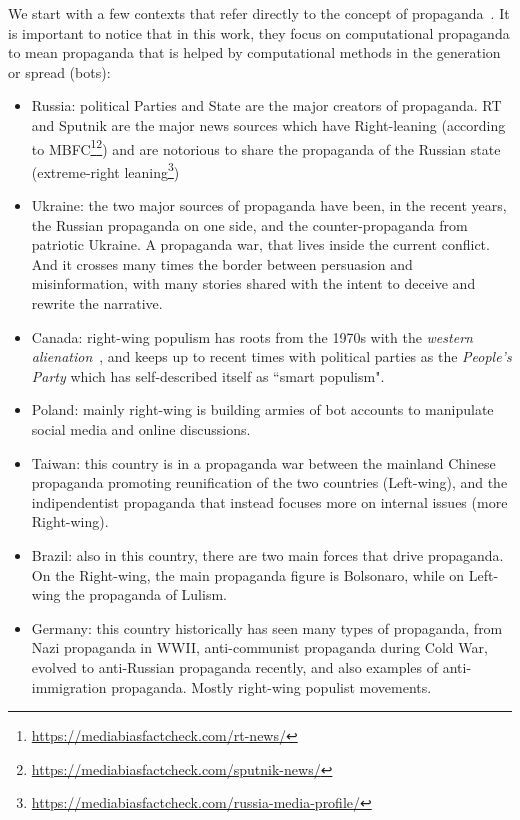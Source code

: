

We start with a few contexts that refer directly to the concept of propaganda~\citep{woolley2018computational}. It is important to notice that in this work, they focus on computational propaganda to mean propaganda that is helped by computational methods in the generation or spread (bots):

\begin{itemize}
    \item Russia: political Parties and State are the major creators of propaganda. RT and Sputnik are the major news sources which have Right-leaning (according to MBFC\footnote{\url{https://mediabiasfactcheck.com/rt-news/}}\footnote{\url{https://mediabiasfactcheck.com/sputnik-news/}}) and are notorious to share the propaganda of the Russian state (extreme-right leaning\footnote{\url{https://mediabiasfactcheck.com/russia-media-profile/}})
    \item Ukraine: the two major sources of propaganda have been, in the recent years, the Russian propaganda on one side, and the counter-propaganda from patriotic Ukraine. A propaganda war, that lives inside the current conflict. And it crosses many times the border between persuasion and misinformation, with many stories shared with the intent to deceive and rewrite the narrative.
    \item Canada: right-wing populism has roots from the 1970s with the \emph{western alienation}~\citep{henry2000revisiting}, and keeps up to recent times with political parties as the \emph{People's Party} which has self-described itself as ``smart populism".
    \item Poland: mainly right-wing is building armies of bot accounts to manipulate social media and online discussions.
    \item Taiwan: this country is in a propaganda war between the mainland Chinese propaganda promoting reunification of the two countries (Left-wing), and the indipendentist propaganda that instead focuses more on internal issues (more Right-wing).
    \item Brazil: also in this country, there are two main forces that drive propaganda. On the Right-wing, the main propaganda figure is Bolsonaro, while on Left-wing the propaganda of Lulism.
    \item Germany: this country historically has seen many types of propaganda, from Nazi propaganda in WWII, anti-communist propaganda during Cold War, evolved to anti-Russian propaganda recently, and also examples of anti-immigration propaganda. Mostly right-wing populist movements.

\end{itemize}
